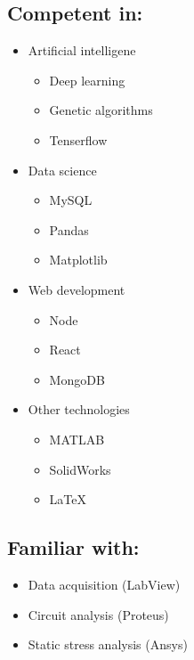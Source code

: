 \documentclass[a4paper, 11pt]{article}
\begin{document}
	\subsection*{Competent in:}
	\vspace{-12pt}
    \begin{multicols}{2}
	
	\begin{itemize}
		
		\item Artificial intelligene
			\vspace{-6pt}
			\begin{itemize}
			\item Deep learning
			\item Genetic algorithms
			\item Tenserflow
			\end{itemize}
		\item Data science
			\vspace{-6pt}
			\begin{itemize}
			\item MySQL
			\item Pandas
			\item Matplotlib
			\end{itemize}
		\item Web development
			\vspace{-6pt}
			\begin{itemize}
			\item Node
			\item React
			\item MongoDB
			\end{itemize}
		\item Other technologies
			\vspace{-6pt}
			\begin{itemize}
			\item MATLAB
			\item SolidWorks
			\item \LaTeX
			\end{itemize}
		\end{itemize}
    	\end{multicols}	
		
		\vspace{-22pt} %
		\subsection*{Familiar with:}
		\vspace{-12pt}
    	\begin{multicols}{2}
		\begin{itemize}
			\item Data acquisition (LabView)
			\item Circuit analysis (Proteus)
			\item Static stress analysis (Ansys)
		\end{itemize}
    	\end{multicols}
\end{document}
